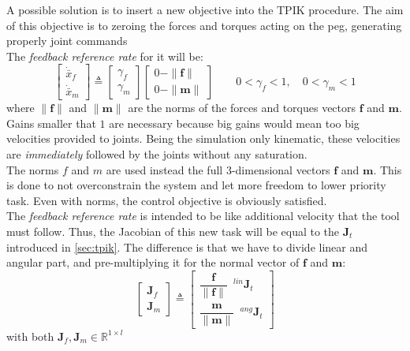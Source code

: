 A possible solution is to insert a new objective into the TPIK procedure. The aim of this objective is to zeroing the forces and torques acting on the peg, generating properly joint commands\\ 
The \textit{feedback reference rate} for it will be:
\begin{equation}
	\begin{bmatrix}{\dot{\bar{x}}}_f \\ {\dot{\bar{x}}}_m \end{bmatrix} \triangleq 
	\begin{bmatrix} \gamma_f \\ \gamma_m \end{bmatrix} 
	\begin{bmatrix}
    0 - \| \boldsymbol{f} \| \\ 0 -\| \boldsymbol{m} \|
	\end{bmatrix} \qquad 0 < \gamma_f < 1, \quad 0 < \gamma_m < 1
\end{equation}
where $\| \boldsymbol{f} \|$ and $\| \boldsymbol{m} \|$ are the norms of the forces and torques vectors $\boldsymbol{f}$ and $\boldsymbol{m}$. Gains smaller that $1$ are necessary because big gains would mean too big velocities provided to joints. Being the simulation only kinematic, these velocities are \textit{immediately} followed by the joints without any saturation.\\
The norms $f$ and $m$ are used instead the full 3-dimensional vectors $\boldsymbol{f}$ and $\boldsymbol{m}$. This is done to not overconstrain the system and let more freedom to lower priority task. Even with norms, the control objective is obviously satisfied.\\
The \textit{feedback reference rate} is intended to be like additional velocity that the tool must follow. Thus, the Jacobian of this new task will be equal to the $\boldsymbol{J}_t$ introduced in \ref{sec:tpik}. The difference is that we have to divide linear and angular part, and pre-multiplying it for the normal vector of $\boldsymbol{f}$ and $\boldsymbol{m}$:
\begin{equation}
	\begin{bmatrix}{\boldsymbol{J}}_f \\[2em] {\boldsymbol{J}}_m \end{bmatrix} \triangleq 
	\begin{bmatrix} \dfrac{\boldsymbol{f}}{\| \boldsymbol{f} \|} \enspace ^{lin}\boldsymbol{J}_t  \\[1.5em]
	\dfrac{\boldsymbol{m}}{\| \boldsymbol{m} \|} \enspace ^{ang}\boldsymbol{J}_t  \end{bmatrix} 
\end{equation}
with both $\boldsymbol{J}_f, \boldsymbol{J}_m \in \mathbb{R}^{1\times l}$

\vspace{30px}



